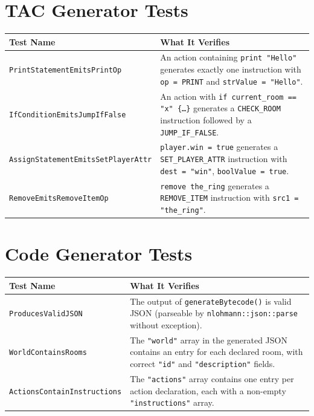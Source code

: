 \documentclass[12pt, a4paper]{article}
\begin{document}
\section{TAC Generator Tests}

\begin{longtable}{p{6.5cm} p{7cm}}
\toprule
\textbf{Test Name} & \textbf{What It Verifies} \\
\midrule
\endhead
\texttt{PrintStatementEmitsPrintOp} &
  An action containing \texttt{print "Hello"} generates exactly one instruction
  with \texttt{op = PRINT} and \texttt{strValue = "Hello"}. \\[4pt]

\texttt{IfConditionEmitsJumpIfFalse} &
  An action with \texttt{if current\_room == "x" \{\ldots\}} generates a
  \texttt{CHECK\_ROOM} instruction followed by a \texttt{JUMP\_IF\_FALSE}. \\[4pt]

\texttt{AssignStatementEmitsSetPlayerAttr} &
  \texttt{player.win = true} generates a \texttt{SET\_PLAYER\_ATTR} instruction
  with \texttt{dest = "win"}, \texttt{boolValue = true}. \\[4pt]

\texttt{RemoveEmitsRemoveItemOp} &
  \texttt{remove the\_ring} generates a \texttt{REMOVE\_ITEM} instruction
  with \texttt{src1 = "the\_ring"}. \\
\bottomrule
\end{longtable}

\section{Code Generator Tests}

\begin{longtable}{p{6.5cm} p{7cm}}
\toprule
\textbf{Test Name} & \textbf{What It Verifies} \\
\midrule
\endhead
\texttt{ProducesValidJSON} &
  The output of \texttt{generateBytecode()} is valid JSON (parseable by
  \texttt{nlohmann::json::parse} without exception). \\[4pt]

\texttt{WorldContainsRooms} &
  The \texttt{"world"} array in the generated JSON contains an entry for each
  declared room, with correct \texttt{"id"} and \texttt{"description"} fields. \\[4pt]

\texttt{ActionsContainInstructions} &
  The \texttt{"actions"} array contains one entry per action declaration, each with
  a non-empty \texttt{"instructions"} array. \\
\bottomrule
\end{longtable}
\end{document}
